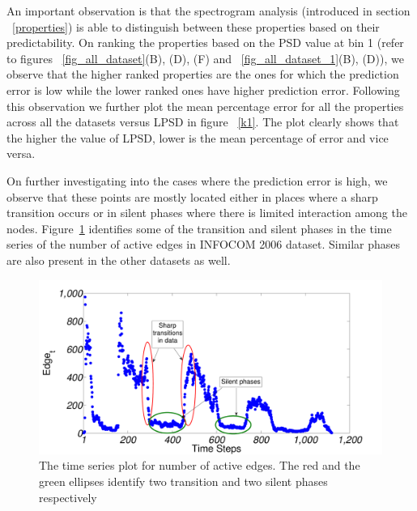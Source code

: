An important observation is that the spectrogram analysis (introduced in section ~\ref{properties}) is able to distinguish between these properties based on their 
 predictability. On ranking the properties based on the PSD value at bin 1 (refer to figures ~\ref{fig_all_dataset}(B), (D), (F) and ~\ref{fig_all_dataset_1}(B), (D)), we observe 
 that the higher ranked properties are the ones for which the prediction error is low while the lower ranked ones have higher prediction error. 
 Following this observation we further plot the mean percentage error for all the properties across all the datasets versus LPSD in figure ~\ref{k1}. 
 The plot clearly shows that the higher the value of LPSD, lower is the 
mean percentage of error and vice versa.

On further investigating into the cases where the prediction error is high, we observe that these points are mostly located either in places where a sharp 
 transition occurs or in silent phases where there is limited interaction among the nodes. Figure~\ref{fig9} identifies some of the transition and silent phases 
 in the time series of the number of active edges in INFOCOM 2006 dataset.
Similar phases are also present in the other datasets as well. 

 \begin{figure}[!ht]
  \begin{center}
  \includegraphics[width=0.7\columnwidth, angle=0]{./texfiles/Chapter_1/fig/no_of_edges1-eps-converted-to.pdf}
  \caption{\label{fig9}The time series plot for number of active edges. The red and the green ellipses identify
  two transition and two silent phases respectively}
  \end{center}
 \end{figure}

